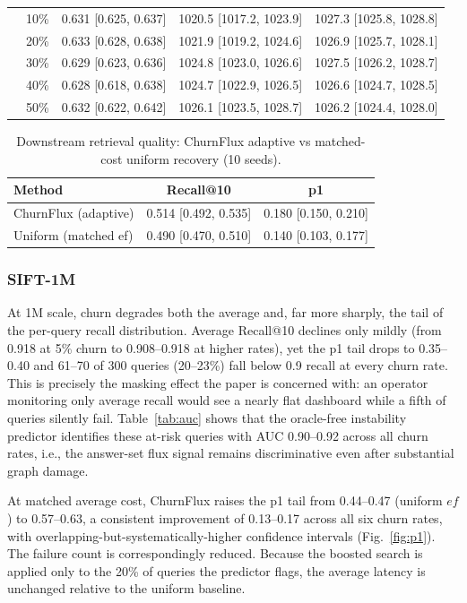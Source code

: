 \documentclass{ieeeaccess}
\begin{document}
\begin{table}[t]
\begin{tabular}{lllll}
 & 10\% & 0.631 [0.625, 0.637] & 1020.5 [1017.2, 1023.9] & 1027.3 [1025.8, 1028.8] \\
 & 20\% & 0.633 [0.628, 0.638] & 1021.9 [1019.2, 1024.6] & 1026.9 [1025.7, 1028.1] \\
 & 30\% & 0.629 [0.623, 0.636] & 1024.8 [1023.0, 1026.6] & 1027.5 [1026.2, 1028.7] \\
 & 40\% & 0.628 [0.618, 0.638] & 1024.7 [1022.9, 1026.5] & 1026.6 [1024.7, 1028.5] \\
 & 50\% & 0.632 [0.622, 0.642] & 1026.1 [1023.5, 1028.7] & 1026.2 [1024.4, 1028.0] \\
\midrule
\bottomrule
\end{tabular}
\end{table}

\begin{table}[!t]
\centering
\caption{Downstream retrieval quality: ChurnFlux adaptive vs matched-cost uniform recovery (10 seeds).}
\label{tab:rag}
\begin{tabular}{lcc}
\toprule
Method & Recall@10 & p1 \\
\midrule
ChurnFlux (adaptive) & 0.514 [0.492, 0.535] & 0.180 [0.150, 0.210] \\
Uniform (matched ef) & 0.490 [0.470, 0.510] & 0.140 [0.103, 0.177] \\
\bottomrule
\end{tabular}
\end{table}

\subsubsection{SIFT-1M}
At 1M scale, churn degrades both the average and, far more sharply, the tail of the per-query recall distribution. Average Recall@10 declines only mildly (from 0.918 at 5\% churn to 0.908--0.918 at higher rates), yet the p1 tail drops to 0.35--0.40 and 61--70 of 300 queries (20--23\%) fall below 0.9 recall at every churn rate. This is precisely the masking effect the paper is concerned with: an operator monitoring only average recall would see a nearly flat dashboard while a fifth of queries silently fail. Table~\ref{tab:auc} shows that the oracle-free instability predictor identifies these at-risk queries with AUC 0.90--0.92 across all churn rates, i.e., the answer-set flux signal remains discriminative even after substantial graph damage.

At matched average cost, ChurnFlux raises the p1 tail from 0.44--0.47 (uniform $ef$) to 0.57--0.63, a consistent improvement of 0.13--0.17 across all six churn rates, with overlapping-but-systematically-higher confidence intervals (Fig.~\ref{fig:p1}). The failure count is correspondingly reduced. Because the boosted search is applied only to the 20\% of queries the predictor flags, the average latency is unchanged relative to the uniform baseline.
\end{document}
